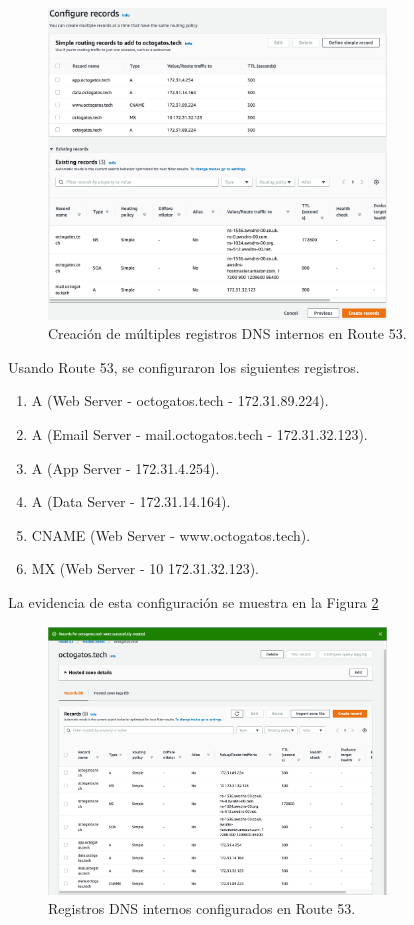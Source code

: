 \documentclass{article}
\begin{document}
\begin{figure}[H]
  \centering
  \includegraphics[width=0.8\textwidth]{DNS/createRecord}
  \caption{Creaci\'on de m\'ultiples registros DNS internos
           en Route 53.}
  \label{fig:createRecord}
\end{figure}


Usando Route 53, se configuraron los siguientes
registros.
\begin{enumerate}
  \item A (Web Server - octogatos.tech - 172.31.89.224).

  \item A (Email Server - mail.octogatos.tech - 172.31.32.123).

  \item A (App Server - 172.31.4.254).

  \item A (Data Server - 172.31.14.164).

  \item CNAME (Web Server - www.octogatos.tech).

  \item MX (Web Server - 10 172.31.32.123).
\end{enumerate}
La evidencia de esta configuraci\'on se muestra en
la Figura \ref{fig:createdRecord}
\begin{figure}[H]
  \centering
  \includegraphics[width=0.8\textwidth]{DNS/createdRecord}
  \caption{Registros DNS internos configurados en Route 53.}
  \label{fig:createdRecord}
\end{figure}
\end{document}
